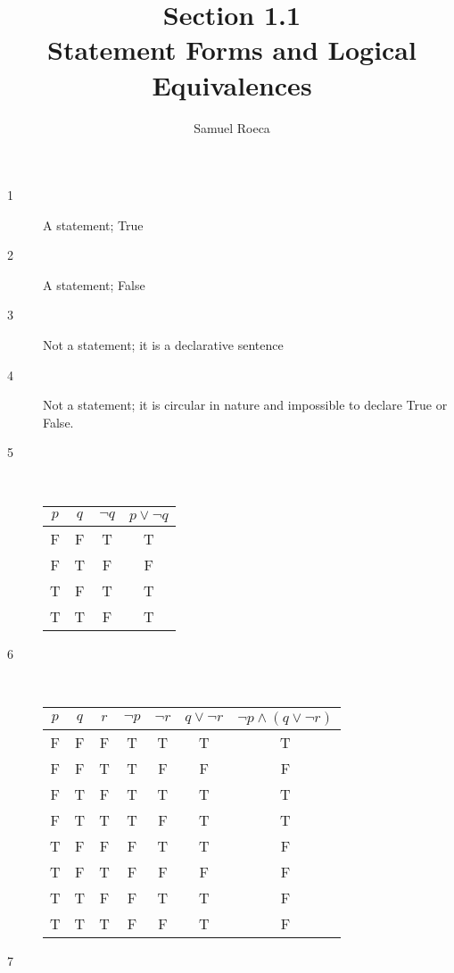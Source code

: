 

\title{Section 1.1 \\ Statement Forms and Logical Equivalences}
\author{Samuel Roeca}


\maketitle
\begin{description}
	\item[1] A statement; True
	\item[2] A statement; False
	\item[3] Not a statement; it is a declarative sentence
	\item[4] Not a statement; it is circular in nature and impossible to declare True or False.
	\item[5] \hfill \\
		\begin{tabular}{c | c | c || c}
			$p$ & 
			$q$ & 
			$\lnot q$ & 
			$p \lor \lnot q$ \\
			\hline
			F & F & T & T \\
			F & T & F & F \\
			T & F & T & T \\
			T & T & F & T \\
		\end{tabular}
	\item[6] \hfill \\
		\begin{tabular}{c | c | c | c | c | c || c}
			$p$ & 
			$q$ & 
			$r$ & 
			$\lnot p$ & 
			$\lnot r$ & 
			$q \lor \lnot r$ & 
			$\lnot p \land (q \lor \lnot r)$ \\
			\hline
			F & F & F & T & T & T & T \\
			F & F & T & T & F & F & F \\
			F & T & F & T & T & T & T \\
			F & T & T & T & F & T & T \\
			T & F & F & F & T & T & F \\
			T & F & T & F & F & F & F \\
			T & T & F & F & T & T & F \\
			T & T & T & F & F & T & F \\
		\end{tabular}
	\item[7] \hfill \\

\end{description}
